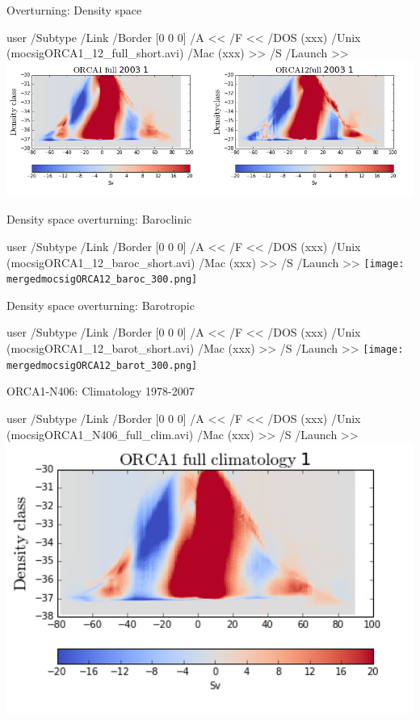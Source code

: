 \documentclass{beamer}
\newcommand{\LaunchBinary}[2]{%
  \leavevmode%
  \pdfstartlink user {
    /Subtype /Link
    /Border [0 0 0]%
    /A <<
      /F <<
         /DOS (xxx)
         /Unix (#1)
         /Mac (xxx)
      >>
      /S /Launch
    >>
  }#2%
  \pdfendlink%
}
\begin{document}
\begin{frame}{Overturning: Density space}
\begin{center}
\LaunchBinary{mocsigORCA1_12_full_short.avi}{\includegraphics[width=1\textwidth]{mergedmocsigORCA12_full_300.png}}%
\end{center}
\end{frame}
% 
\begin{frame}{Density space overturning: Baroclinic}
\begin{center}
\LaunchBinary{mocsigORCA1_12_baroc_short.avi}{\texttt{[image: mergedmocsigORCA12\_baroc\_300.png]}}%
\end{center}
\end{frame}
\begin{frame}{Density space overturning: Barotropic}
\begin{center}
\LaunchBinary{mocsigORCA1_12_barot_short.avi}{\texttt{[image: mergedmocsigORCA12\_barot\_300.png]}}%
\end{center}
\end{frame}

\begin{frame}{ORCA1-N406: Climatology 1978-2007}
\begin{center}
\LaunchBinary{mocsigORCA1_N406_full_clim.avi}{\includegraphics[width=1\textwidth]{mocsigORCA1_N406_full_clim1.png}}%
\end{center}
\end{frame}
\end{document}
